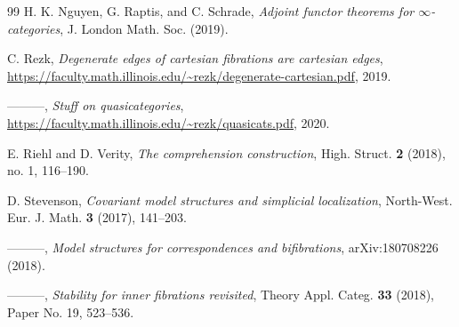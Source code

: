 \begin{thebibliography}{99}
 H. K. Nguyen, G. Raptis, and C. Schrade, \emph{Adjoint functor
theorems for $\infty$-categories}, J. London Math. Soc. (2019).

 C. Rezk, \emph{Degenerate edges of cartesian fibrations are
cartesian edges}, \url{https://faculty.math.illinois.edu/~rezk/degenerate-cartesian.pdf},
2019.

 ———, \emph{Stuff on quasicategories},
\url{https://faculty.math.illinois.edu/~rezk/quasicats.pdf}, 2020.

 E. Riehl and D. Verity, \emph{The comprehension construction},
High. Struct. \textbf{2} (2018), no. 1, 116--190.

 D. Stevenson, \emph{Covariant model structures and simplicial
localization}, North-West. Eur. J. Math. \textbf{3} (2017), 141--203.

 ———, \emph{Model structures for correspondences and
bifibrations}, arXiv:180708226 (2018).

 ———, \emph{Stability for inner fibrations revisited}, Theory
Appl. Categ. \textbf{33} (2018), Paper No. 19, 523--536.

\end{thebibliography}
